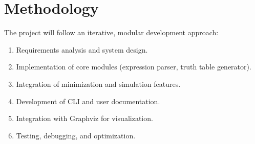 \section{Methodology}
The project will follow an iterative, modular development approach:

\begin{enumerate}
    \item Requirements analysis and system design.
    \item Implementation of core modules (expression parser, truth table generator).
    \item Integration of minimization and simulation features.
    \item Development of CLI and user documentation.
    \item Integration with Graphviz for visualization.
    \item Testing, debugging, and optimization.
\end{enumerate}